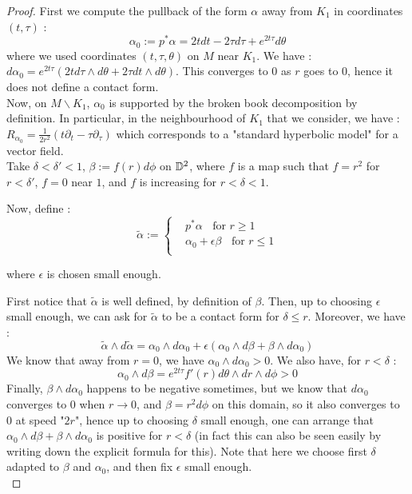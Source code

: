 \documentclass[../main.tex]{subfiles}
\begin{document}
\begin{proof}
First we compute the pullback of the form $\alpha$ away from $K_1$ in coordinates $(t,\tau)$ :
$$\alpha_0  := p^*\alpha = 2tdt - 2\tau d\tau + e^{2t\tau}d\theta$$
where we used coordinates $(t,\tau,\theta)$ on $M$ near $K_1$. We have : $d\alpha_0 = e^{2t\tau}(2td\tau\wedge d\theta + 2\tau dt \wedge d\theta)$. This converges to $0$ as $r$ goes to $0$, hence it does not define a contact form. \\
Now, on $M\backslash K_1$, $\alpha_0$ is supported by the broken book decomposition by definition. In particular, in the neighbourhood of $K_1$ that we consider, we have : $R_{{\alpha_0}} = \frac{1}{2r^2}(t\partial_t - \tau\partial_\tau)$ which corresponds to a "standard hyperbolic model" for a vector field. \\
Take $\delta<\delta'<1$, $\beta:= f(r)d\phi$ on $\mathbb{D}^2$, where $f$ is a map such that $f = r^2$ for $r<\delta'$, $f = 0$ near $1$, and $f$ is increasing for $r< \delta < 1$.

Now, define : 
$$
\tilde{\alpha} := \left\{\begin{array}{ll}
& p^* \alpha \;\;\mbox{  for  } r\geq 1\\
& \alpha_0 + \epsilon \beta \;\; \mbox{ for } r\leq 1\\
\end{array}
\right.$$

where $\epsilon$ is chosen small enough. 

First notice that $\tilde{\alpha}$ is well defined, by definition of $\beta$. Then, up to choosing $\epsilon $ small enough, we can ask for $\tilde{\alpha}$ to be a contact form for $\delta\leq r$. Moreover, we have : 
$$\tilde{\alpha}\wedge d\tilde{\alpha} = \alpha_0\wedge d\alpha_0 + \epsilon (\alpha_0\wedge d\beta + \beta\wedge d\alpha_0)$$
We know that away from $r = 0$, we have $\alpha_0\wedge d\alpha_0> 0$. We also have, for $r< \delta$ : 
$$\alpha_0\wedge d\beta = e^{2t\tau}f'(r)d\theta\wedge dr\wedge d\phi > 0$$
Finally, $\beta \wedge d\alpha_0$ happens to be negative sometimes, but we know that $d\alpha_0$ converges to $0$ when $r\rightarrow 0$, and $\beta = r^2d\phi$ on this domain, so it also converges to $0$ at speed "$2r$", hence up to choosing $\delta$ small enough, one can arrange that $\alpha_0 \wedge d\beta + \beta \wedge d\alpha_0$ is positive for $r< \delta $ (in fact this can also be seen easily by writing down the explicit formula for this). Note that here we choose first $\delta$ adapted to $\beta$ and $\alpha_0$, and then fix $\epsilon$ small enough.\\


\end{proof}
\end{document}
